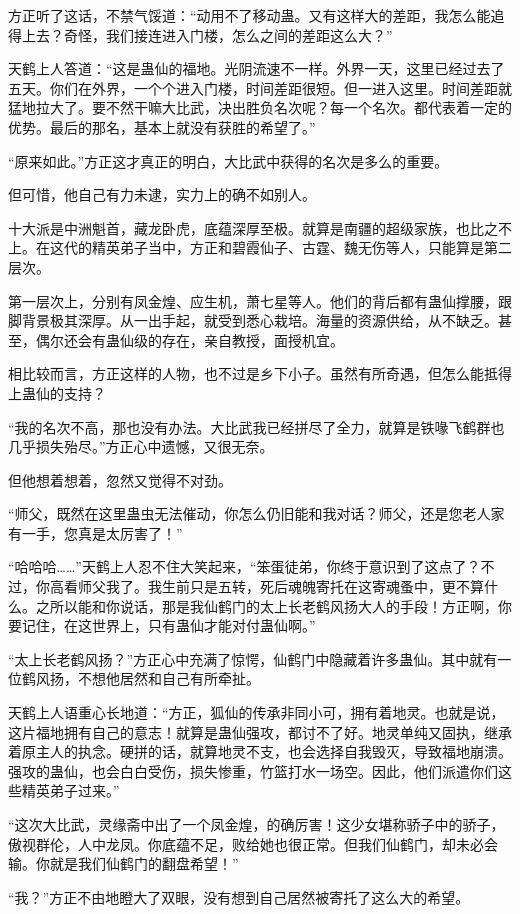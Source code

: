 \begin{this_body}
方正听了这话，不禁气馁道：“动用不了移动蛊。又有这样大的差距，我怎么能追得上去？奇怪，我们接连进入门楼，怎么之间的差距这么大？”

天鹤上人答道：“这是蛊仙的福地。光阴流速不一样。外界一天，这里已经过去了五天。你们在外界，一个个进入门楼，时间差距很短。但一进入这里。时间差距就猛地拉大了。要不然干嘛大比武，决出胜负名次呢？每一个名次。都代表着一定的优势。最后的那名，基本上就没有获胜的希望了。”

“原来如此。”方正这才真正的明白，大比武中获得的名次是多么的重要。

但可惜，他自己有力未逮，实力上的确不如别人。

十大派是中洲魁首，藏龙卧虎，底蕴深厚至极。就算是南疆的超级家族，也比之不上。在这代的精英弟子当中，方正和碧霞仙子、古霆、魏无伤等人，只能算是第二层次。

第一层次上，分别有凤金煌、应生机，萧七星等人。他们的背后都有蛊仙撑腰，跟脚背景极其深厚。从一出手起，就受到悉心栽培。海量的资源供给，从不缺乏。甚至，偶尔还会有蛊仙级的存在，亲自教授，面授机宜。

相比较而言，方正这样的人物，也不过是乡下小子。虽然有所奇遇，但怎么能抵得上蛊仙的支持？

“我的名次不高，那也没有办法。大比武我已经拼尽了全力，就算是铁喙飞鹤群也几乎损失殆尽。”方正心中遗憾，又很无奈。

但他想着想着，忽然又觉得不对劲。

“师父，既然在这里蛊虫无法催动，你怎么仍旧能和我对话？师父，还是您老人家有一手，您真是太厉害了！”

“哈哈哈……”天鹤上人忍不住大笑起来，“笨蛋徒弟，你终于意识到了这点了？不过，你高看师父我了。我生前只是五转，死后魂魄寄托在这寄魂蚤中，更不算什么。之所以能和你说话，那是我仙鹤门的太上长老鹤风扬大人的手段！方正啊，你要记住，在这世界上，只有蛊仙才能对付蛊仙啊。”

“太上长老鹤风扬？”方正心中充满了惊愕，仙鹤门中隐藏着许多蛊仙。其中就有一位鹤风扬，不想他居然和自己有所牵扯。

天鹤上人语重心长地道：“方正，狐仙的传承非同小可，拥有着地灵。也就是说，这片福地拥有自己的意志！就算是蛊仙强攻，都讨不了好。地灵单纯又固执，继承着原主人的执念。硬拼的话，就算地灵不支，也会选择自我毁灭，导致福地崩溃。强攻的蛊仙，也会白白受伤，损失惨重，竹篮打水一场空。因此，他们派遣你们这些精英弟子过来。”

“这次大比武，灵缘斋中出了一个凤金煌，的确厉害！这少女堪称骄子中的骄子，傲视群伦，人中龙凤。你底蕴不足，败给她也很正常。但我们仙鹤门，却未必会输。你就是我们仙鹤门的翻盘希望！”

“我？”方正不由地瞪大了双眼，没有想到自己居然被寄托了这么大的希望。


\end{this_body}
